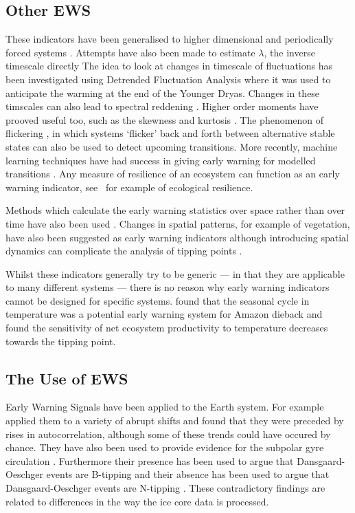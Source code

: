 \subsection{Other EWS}
These indicators have been generalised to higher dimensional and periodically forced systems \parencite{Williamson2015,Williamson2016}. Attempts have also been made to estimate
$\lambda$, the inverse timescale directly \parencite{Boettner2022,Boers2021a} The idea to look at
changes in timescale of fluctuations has been investigated using Detrended Fluctuation Analysis \parencite{Livina2007} where it was used to anticipate the warming at the
end of the Younger Dryas. Changes in these timscales can also lead to spectral reddening \parencite{Kleinen2003}. Higher order moments have prooved useful too, such as the
skewness \parencite{Guttal2008} and kurtosis \parencite{Xie2019}. The phenomenon of flickering \parencite{Wang2012}, in which systems `flicker' back and forth between alternative stable
states can also be used to detect upcoming transitions. More recently, machine learning techniques have had success in giving early warning for modelled transitions \parencite{Bury2021}.
Any measure of resilience of an ecosystem can function as an early warning indicator, see~\cite{Krakovska2023} for example of ecological resilience.


Methods which calculate the early warning statistics over space rather than over time have also been used \parencite{Donangelo2010,Guttal2009}. Changes in spatial
patterns, for example of vegetation, have also been suggested as early warning indicators \parencite{Kefi2007,Kefi2014} although introducing spatial dynamics can complicate the analysis
of tipping points \parencite{Rietkerk2021}.

Whilst these indicators generally try to be generic --- in that they are applicable to many different systems --- there is no reason why early warning indicators cannot be designed for specific systems.
\cite{Parry2022} found that the seasonal cycle in temperature was a potential early warning system for Amazon dieback and~\cite{Boulton2013} found the sensitivity of net ecosystem productivity to temperature decreases
towards the tipping point.

\subsection{The Use of EWS}
Early Warning Signals have been applied to the Earth system. For example~\cite{Dakos2008} applied them to a variety of abrupt shifts and found that they were preceded by rises in autocorrelation,
although some of these trends could have occured by chance. They have also been used to provide evidence for the subpolar gyre circulation \parencite{Arellano-Nava2022}. Furthermore their presence has been
used to argue that Dansgaard-Oeschger events are B-tipping \parencite{Boers2018a} and their absence has been used to argue that Dansgaard-Oeschger events are N-tipping \parencite{Ditlevsen2010}. These contradictory findings
are related to differences in the way the ice core data is processed.

